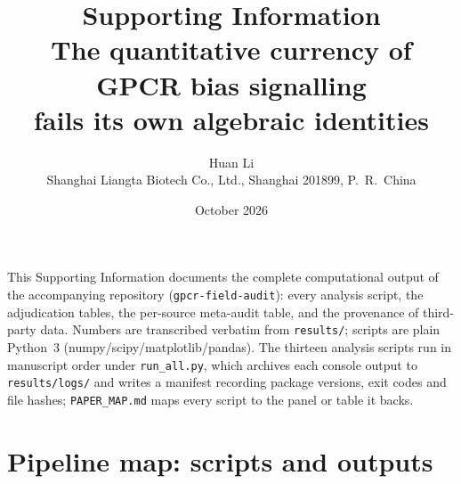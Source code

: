 \documentclass[11pt]{article}
\title{\bfseries Supporting Information\\[4pt]
\large The quantitative currency of GPCR bias signalling\\
fails its own algebraic identities}
\author{Huan Li\\ \small Shanghai Liangta Biotech Co., Ltd., Shanghai 201899, P.\ R.\ China}
\date{October 2026}
\begin{document}
\sloppy
\maketitle

\noindent This Supporting Information documents the complete computational
output of the accompanying repository (\texttt{gpcr-field-audit}): every analysis script,
the adjudication tables, the per-source meta-audit table, and the provenance of third-party
data. Numbers are transcribed verbatim from \texttt{results/}; scripts are plain Python~3
(numpy/scipy/matplotlib/pandas). The thirteen analysis scripts run in manuscript order under
\texttt{run\_all.py}, which archives each console output to \texttt{results/logs/} and writes a
manifest recording package versions, exit codes and file hashes; \texttt{PAPER\_MAP.md} maps every
script to the panel or table it backs.

\tableofcontents
\newpage

\section{Pipeline map: scripts and outputs}
\end{document}
